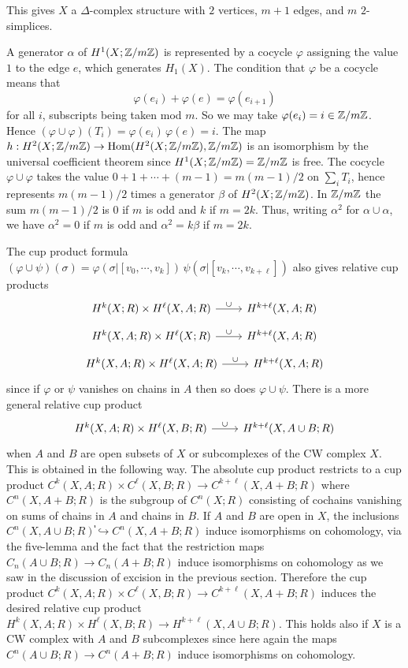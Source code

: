 \begin{example}
This gives $X$ a $\Delta$-complex structure with $2$ vertices, $m+1$ edges, and $m$ $2$-simplices.\par
A generator $\alpha$ of $H^1(X;\mathbb{Z}/m\mathbb{Z})$ is represented by a cocycle $\varphi$ assigning the value $1$ to the edge $e$, which generates $H_1(X)$. The condition that $\varphi$ be a cocycle means that \[\varphi(e_i)+\varphi(e)=\varphi(e_{i+1})\]
for all $i$, subscripts being taken mod $m$. So we may take $\varphi(e_i)=i\in\mathbb{Z}/m\mathbb{Z}$. Hence $(\varphi\cup\varphi)(T_i)=\varphi(e_i)\,\varphi(e)=i$. The map
$h:H^2(X;\mathbb{Z}/m\mathbb{Z})\to\mathrm{Hom}(H^2(X;\mathbb{Z}/m\mathbb{Z}),\mathbb{Z}/m\mathbb{Z})$ is an isomorphism by the universal coefficient theorem since $H^1(X;\mathbb{Z}/m\mathbb{Z})=\mathbb{Z}/m\mathbb{Z}$ is free. The cocycle $\varphi\cup\varphi$ takes the value $0+1+\cdots+(m-1)=m(m-1)/2$ on $\sum_iT_i$, hence represents $m(m-1)/2$ times a generator $\beta$ of $H^2(X;\mathbb{Z}/m\mathbb{Z})$. In $\mathbb{Z}/m\mathbb{Z}$ the sum $m(m-1)/2$ is $0$ if $m$ is odd and $k$ if $m=2k$. Thus, writing $\alpha^2$ for $\alpha\cup\alpha$, we have $\alpha^2=0$ if $m$ is odd and $\alpha^2=k\beta$ if $m=2k$.
\end{example}
The cup product formula $(\varphi\cup\psi)(\sigma)=\varphi(\sigma|[v_0,\cdots,v_k])\,\psi(\sigma|[v_{k},\cdots,v_{k+\ell}])$ also gives relative cup products
\[\begin{tikzcd}
H^k(X;R)\times H^\ell(X,A;R)\ar[r,"\cup"]&H^{k+\ell}(X,A;R)
\end{tikzcd}\]
\[\begin{tikzcd}
H^k(X,A;R)\times H^\ell(X;R)\ar[r,"\cup"]&H^{k+\ell}(X,A;R)
\end{tikzcd}\]
\[\begin{tikzcd}
H^k(X,A;R)\times H^\ell(X,A;R)\ar[r,"\cup"]&H^{k+\ell}(X,A;R)
\end{tikzcd}\]
since if $\varphi$ or $\psi$ vanishes on chains in $A$ then so does $\varphi\cup\psi$. There is a more general relative cup product
\[\begin{tikzcd}
H^k(X,A;R)\times H^\ell(X,B;R)\ar[r,"\cup"]&H^{k+\ell}(X,A\cup B;R)
\end{tikzcd}\]
when $A$ and $B$ are open subsets of $X$ or subcomplexes of the CW complex $X$. This is obtained in the following way. The absolute cup product restricts to a cup product $C^k(X,A;R)\times C^\ell(X,B;R)\to C^{k+\ell}(X,A+B;R)$ where $C^n(X,A+B;R)$ is the subgroup of $C^n(X;R)$ consisting of cochains vanishing on sums of chains in $A$ and chains in $B$. If $A$ and $B$ are open in $X$, the inclusions $C^n(X,A\cup B;R)֓\hookrightarrow C^n(X,A+B;R)$ induce isomorphisms on cohomology, via the five-lemma and the fact that the restriction maps $C_n(A\cup B;R)\to C_n(A+B;R)$ induce isomorphisms on cohomology as we saw in the discussion of excision in the previous section. Therefore the cup product $C^k(X,A;R)\times C^\ell(X,B;R)\to C^{k+\ell}(X,A+B;R)$ induces the desired relative cup product $H^k(X,A;R)\times H^\ell(X,B;R)\to H^{k+\ell}(X,A\cup B;R)$. This holds also if $X$ is a CW complex with $A$ and $B$ subcomplexes since here again the maps $C^n(A\cup B;R)\to C^n(A+B;R)$ induce isomorphisms on cohomology.

